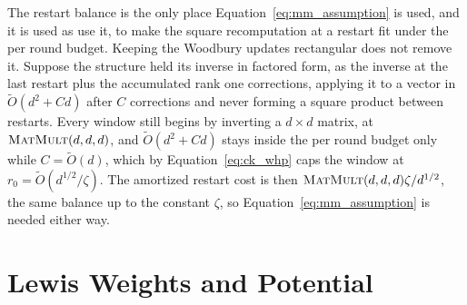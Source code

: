 \documentclass[11pt]{article}
\newcommand{\MM}{\textsc{MatMult}}
\renewcommand{\O}{\widetilde O}
\begin{document}
The restart balance is the only place Equation~\eqref{eq:mm_assumption} is used,
and it is used as \cite{LS15} use it, to make the square
recomputation at a restart fit under the per round budget.
Keeping the Woodbury updates rectangular does not remove it.
Suppose the structure held its inverse in factored form, as the inverse at the
last restart plus the accumulated rank one corrections, applying it to a vector
in $\O(d^{2} + C d)$ after
$C$ corrections and never forming a square product between restarts.
Every window still begins by inverting a $d \times d$ matrix, at
$\MM(d, d, d)$, and
$\O(d^{2} + C d)$ stays inside the per round budget only while
$C = \O(d)$, which by Equation~\eqref{eq:ck_whp} caps the window at
$r_0 = \O(d^{1/2} / \zeta)$.
The amortized restart cost is then $\MM(d, d, d) \zeta / d^{1/2}$, the same
balance up to the constant $\zeta$, so Equation~\eqref{eq:mm_assumption} is
needed either way.

\section{Lewis Weights and Potential}
\label{sec:lewis}
\end{document}
